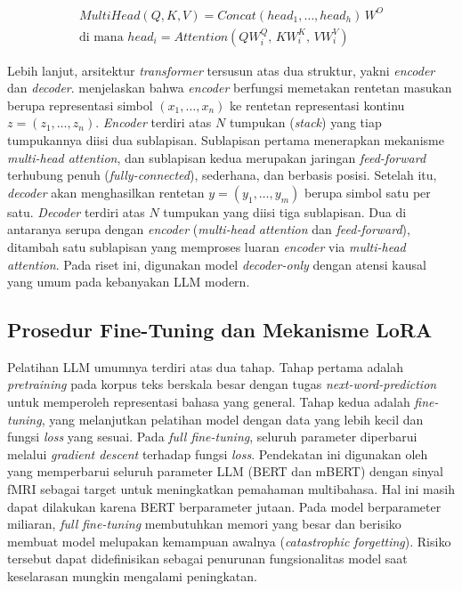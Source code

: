 \begin{equation}
  \begin{gathered}
    MultiHead(Q,K,V) = Concat(head_1, \ldots, head_h)\, W^O \\
    \text{di mana } head_i = Attention(Q W_i^Q,\, K W_i^K,\, V W_i^V)
    \label{eq:multihead}
  \end{gathered}
\end{equation}

Lebih lanjut, arsitektur \textit{transformer} tersusun atas dua struktur, yakni \textit{encoder} dan \textit{decoder}. \textcite{vaswani2017attention} menjelaskan bahwa \textit{encoder} berfungsi memetakan rentetan masukan berupa representasi simbol $(x_1, \ldots, x_n)$ ke rentetan representasi kontinu $z = (z_1, \ldots, z_n)$. \textit{Encoder} terdiri atas $N$ tumpukan (\textit{stack}) yang tiap tumpukannya diisi dua sublapisan. Sublapisan pertama menerapkan mekanisme \textit{multi-head attention}, dan sublapisan kedua merupakan jaringan \textit{feed-forward} terhubung penuh (\textit{fully-connected}), sederhana, dan berbasis posisi. Setelah itu, \textit{decoder} akan menghasilkan rentetan $y = (y_1, \ldots, y_m)$ berupa simbol satu per satu. \textit{Decoder} terdiri atas $N$ tumpukan yang diisi tiga sublapisan. Dua di antaranya serupa dengan \textit{encoder} (\textit{multi-head attention} dan \textit{feed-forward}), ditambah satu sublapisan yang memproses luaran \textit{encoder} via \textit{multi-head attention}. Pada riset ini, digunakan model \textit{decoder-only} dengan atensi kausal yang umum pada kebanyakan LLM modern.

\subsection{Prosedur {Fine-Tuning} dan Mekanisme LoRA}
\label{sub:sl_finetuning}
 
Pelatihan LLM umumnya terdiri atas dua tahap. Tahap pertama adalah \textit{pretraining} pada korpus teks berskala besar dengan tugas \textit{next-word-prediction} untuk memperoleh representasi bahasa yang general. Tahap kedua adalah \textit{fine-tuning}, yang melanjutkan pelatihan model dengan data yang lebih kecil dan fungsi \textit{loss} yang sesuai. Pada \textit{full fine-tuning}, seluruh parameter diperbarui melalui \textit{gradient descent} terhadap fungsi \textit{loss}. Pendekatan ini digunakan oleh \textcite{negi2025brain} yang memperbarui seluruh parameter LLM (BERT dan mBERT) dengan sinyal fMRI sebagai target untuk meningkatkan pemahaman multibahasa. %
Hal ini masih dapat dilakukan karena BERT berparameter jutaan. Pada model berparameter miliaran, \textit{full fine-tuning} membutuhkan memori yang besar dan berisiko membuat model melupakan kemampuan awalnya (\textit{catastrophic forgetting}). Risiko tersebut dapat didefinisikan sebagai penurunan fungsionalitas model saat keselarasan mungkin mengalami peningkatan.
 
